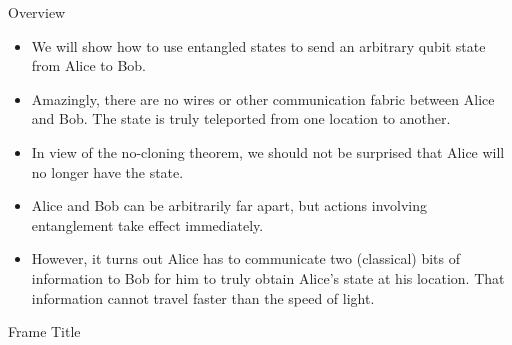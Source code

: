 
\begin{frame}{Overview}
    \begin{itemize}
        \item We will show how to use entangled states to send an arbitrary qubit state from Alice to Bob.
        \item Amazingly, there are no wires or other communication fabric between Alice and Bob.  The state is truly teleported from one location to another.
        \item In view of the no-cloning theorem, we should not be surprised that Alice will no longer have the state.
        \item Alice and Bob can be arbitrarily far apart, but actions involving entanglement take effect immediately.
        \item However, it turns out Alice has to communicate two (classical) bits of information to Bob for him to truly obtain Alice's state at his location.  That information cannot travel faster than the speed of light.
    \end{itemize}
\end{frame}

\begin{frame}{Frame Title}
    
\end{frame}